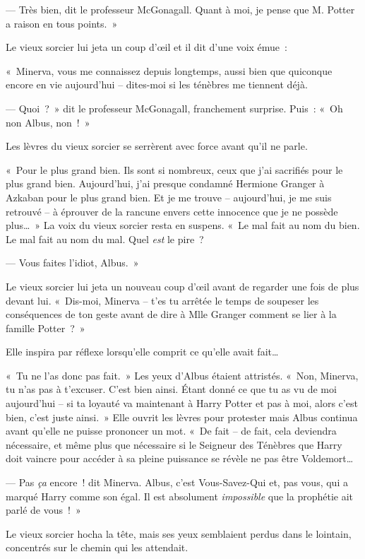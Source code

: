 --- Très bien, dit le professeur McGonagall. Quant à moi, je pense que M. Potter a raison en tous points.~»

Le vieux sorcier lui jeta un coup d'œil et il dit d'une voix émue~:

«~Minerva, vous me connaissez depuis longtemps, aussi bien que quiconque encore en vie aujourd'hui -- dites-moi si les ténèbres me tiennent déjà.

--- Quoi~?~» dit le professeur McGonagall, franchement surprise. Puis~: «~Oh non Albus, non~!~»

Les lèvres du vieux sorcier se serrèrent avec force avant qu'il ne parle.

«~Pour le plus grand bien. Ils sont si nombreux, ceux que j'ai sacrifiés pour le plus grand bien. Aujourd'hui, j'ai presque condamné Hermione Granger à Azkaban pour le plus grand bien. Et je me trouve -- aujourd'hui, je me suis retrouvé -- à éprouver de la rancune envers cette innocence que je ne possède plus…~» La voix du vieux sorcier resta en suspens. «~Le mal fait au nom du bien. Le mal fait au nom du mal. Quel \emph{est} le pire~?

--- Vous faites l'idiot, Albus.~»

Le vieux sorcier lui jeta un nouveau coup d'œil avant de regarder une fois de plus devant lui. «~Dis-moi, Minerva -- t'es tu arrêtée le temps de soupeser les conséquences de ton geste avant de dire à Mlle Granger comment se lier à la famille Potter~?~»

Elle inspira par réflexe lorsqu'elle comprit ce qu'elle avait fait…

«~Tu ne l'as donc pas fait.~» Les yeux d'Albus étaient attristés. «~Non, Minerva, tu n'as pas à t'excuser. C'est bien ainsi. Étant donné ce que tu as vu de moi aujourd'hui -- si ta loyauté va maintenant à Harry Potter et pas à moi, alors c'est bien, c'est juste ainsi.~» Elle ouvrit les lèvres pour protester mais Albus continua avant qu'elle ne puisse prononcer un mot. «~De fait -- de fait, cela deviendra nécessaire, et même plus que nécessaire si le Seigneur des Ténèbres que Harry doit vaincre pour accéder à sa pleine puissance se révèle ne pas être Voldemort…

--- Pas \emph{ça} encore~! dit Minerva. Albus, c'est Vous-Savez-Qui et, pas vous, qui a marqué Harry comme son égal. Il est absolument \emph{impossible} que la prophétie ait parlé de vous~!~»

Le vieux sorcier hocha la tête, mais ses yeux semblaient perdus dans le lointain, concentrés sur le chemin qui les attendait.

